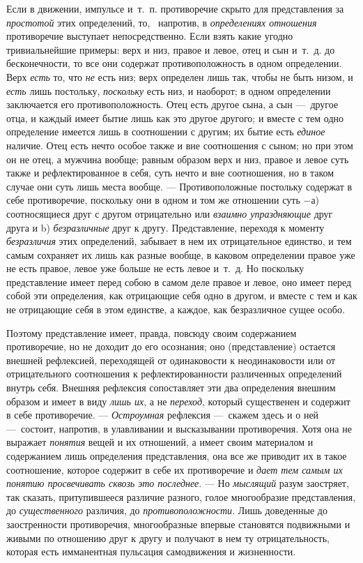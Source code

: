 Если в движении, импульсе и~т.~п. противоречие скрыто для представления за
{\em простотой} этих определений, то, \ напротив, в
{\em определениях отношения} противоречие выступает
непосредственно. Если взять какие угодно тривиальнейшие примеры: верх и
низ, правое и левое, отец и сын и~т.~д. до бесконечности, то все они
содержат противоположность в одном определении. Верх
{\em есть} то, что {\em не} есть
низ; верх определен лишь так, чтобы не быть низом, и
{\em есть} лишь постольку,
{\em поскольку} есть низ, и наоборот; в одном
определении заключается его противоположность. Отец есть другое сына, а сын
—~другое отца, и каждый имеет бытие лишь как это другое другого; и вместе с
тем одно определение имеется лишь в соотношении с другим; их бытие есть
{\em единое} наличие. Отец есть нечто особое также и
вне соотношения с сыном; но при этом он не отец, а мужчина вообще; равным
образом верх и низ, правое и левое суть также и рефлектированное в себя,
суть нечто и вне соотношения, но в таком случае они суть лишь места вообще.
— Противоположные постольку содержат в себе противоречие, поскольку они в
одном и том же отношении суть $-а$) соотносящиеся
друг с другом отрицательно или {\em взаимно
упраздняющие} друг друга и b) {\em безразличные} друг к
другу. Представление, переходя к моменту
{\em безразличия} этих определений, забывает в нем их
отрицательное единство, и тем самым сохраняет их лишь как разные вообще, в
каковом определении правое уже не есть правое, левое уже больше не есть
левое и~т.~д. Но поскольку представление имеет перед собою в самом деле
правое и левое, оно имеет перед собой эти определения, как отрицающие себя
одно в другом, и вместе с тем и как не отрицающие себя в этом единстве, а
каждое, как безразличное сущее особо.

Поэтому представление имеет, правда, повсюду своим содержанием противоречие,
но не доходит до его осознания; оно (представление) остается внешней
рефлексией, переходящей от одинаковости к неодинаковости или от
отрицательного соотношения к рефлектированности различенных определений
внутрь себя. Внешняя рефлексия сопоставляет эти два определения внешним
образом и имеет в виду {\em лишь их}, а не
{\em переход}, который существенен и содержит в себе
противоречие. — {\em Остроумная} рефлексия —~скажем
здесь и о ней —~состоит, напротив, в улавливании и высказывании
противоречия. Хотя она не выражает {\em понятия} вещей
и их отношений, а имеет своим материалом и содержанием лишь определения
представления, она все же приводит их в такое соотношение, которое содержит
в себе их противоречие и {\em дает тем самым их понятию
просвечивать сквозь это последнее}. — Но {\em мыслящий}
разум заостряет, так сказать, притупившееся различие разного, голое
многообразие представления, до {\em существенного}
различия, до {\em противоположности}. Лишь доведенные
до заостренности противоречия, многообразные впервые становятся подвижными
и живыми по отношению друг к другу и получают в нем ту отрицательность,
которая есть имманентная пульсация самодвижения и жизненности.

